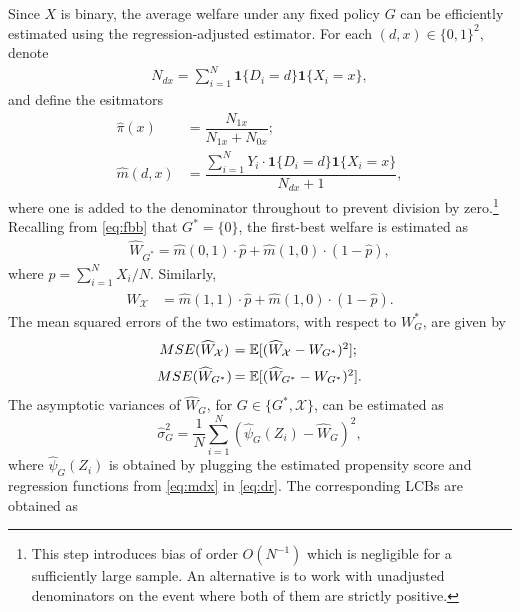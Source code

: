 \documentclass[12pt]{article}
\numberwithin{equation}{section}
\theoremstyle{plain}                         %
\theoremstyle{definition}                  %
\theoremstyle{remark}                      %
\newcommand{\E}{\mathbb{E}}
\begin{document}
Since $X$ is binary, the average welfare under any fixed policy $G$ can be efficiently estimated using the regression-adjusted estimator. For each \((d,x) \in \{0, 1\}^2\), denote
\begin{align}
\label{eq:ndx}
N_{dx} = \sum_{i=1}^N \bm{1}\{ D_i = d \} \bm{1}\{ X_i =x \},
\end{align}
and define the esitmators
\begin{equation} \label{eq:mdx}
\begin{array}{cl} 
\widehat \pi(x) &= \dfrac{N_{1x}}{N_{1x} + N_{0x}};\\[5mm] 
\widehat m(d,x)  &= \dfrac{\sum_{i=1}^N Y_i \cdot \bm{1}\{ D_i = d \} \bm{1}\{ X_i =x \}}{N_{dx}+1}, 
\end{array}
\end{equation}
where one is added to the denominator throughout to prevent division by zero.\footnote{This step introduces bias of order $O(N^{-1})$ which is negligible for a sufficiently large sample. An alternative is to work with unadjusted denominators on the event where both of them are strictly positive.} Recalling from \eqref{eq:fbb} that $G^* = \{0\}$, the first-best welfare is estimated as
\begin{align}
\widehat {W}_{G^{*}} =  \widehat m(0, 1) \cdot  \widehat p +  \widehat m(1, 0) \cdot (1- \widehat p), \label{eq:oracle2}  
\end{align}
where $\widehat p  = \sum_{i=1}^N X_i/N$. Similarly,  
\begin{align}
\widehat {W}_{\mathcal{X}} &= \widehat m(1, 1) \cdot  \widehat{p} + \widehat m(1, 0) \cdot (1-\widehat{p}). \label{eq:m0} 
\end{align}
The mean squared errors of the two estimators, with respect to $W_G^*$, are given by
\begin{equation} \label{eq:mse1} \arraycolsep=1.pt
    \begin{array}{cl}
       MSE (\widehat{W}_{\mathcal{X}})  &= \E [(\widehat{W}_{\mathcal{X}} - W_{G^{*}})^2];  \\[2mm]
       MSE(\widehat W_{G^{*}})  &= \E [(\widehat W_{G^{*}} - W_{G^{*}})^2].
    \end{array}
\end{equation} 
The asymptotic variances of $\widehat{W}_G$, for $G \in \{G^*, \mathcal{X}\}$, can be estimated as
$$
\widehat \sigma^2_G = \dfrac{1}{N} \sum_{i=1}^N (\widehat \psi_G(Z_i) - \widehat {W}_G)^2, 
$$
where $\widehat{\psi}_G(Z_i)$ is obtained by plugging the estimated propensity score  and regression functions from \eqref{eq:mdx} in \eqref{eq:dr}. The corresponding LCBs are obtained as
\end{document}
